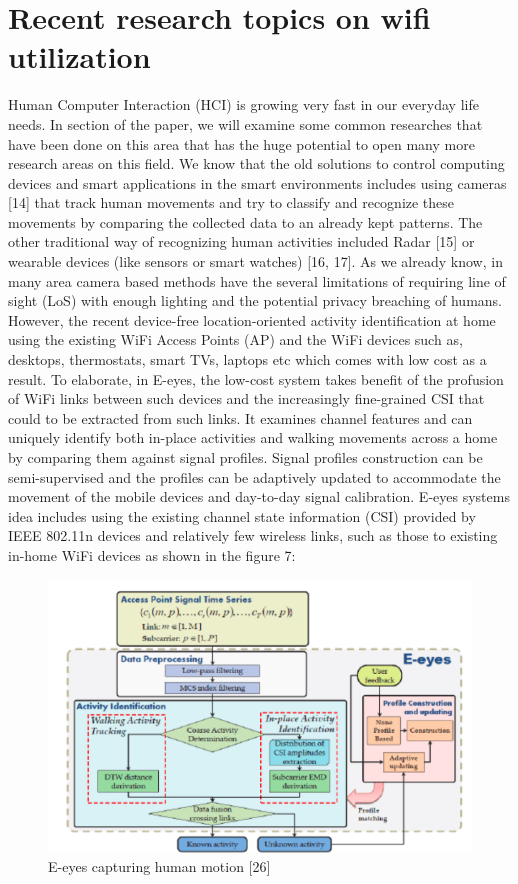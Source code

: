 \documentclass[conference]{IEEEtran}
\begin{document}
\section{Recent research topics on wifi utilization}
Human Computer Interaction (HCI) is growing very fast in our everyday life needs. In section of the paper, we will examine some common researches that have been done on this area that has the huge potential to open many more research areas on this field. We know that  the old solutions to control computing devices and smart applications in the smart environments includes using cameras [14] that track human 
movements and try to classify and recognize these movements by comparing the collected data to an already kept patterns. The other traditional way of recognizing human activities included Radar [15] or wearable devices (like sensors or smart watches) [16, 17]. As we already know, in many area camera based methods have the several limitations of requiring line of sight (LoS) with enough lighting and the potential privacy breaching of humans. 
\newline 
However, the recent device-free location-oriented activity identification at home using the existing WiFi Access Points (AP) and the WiFi devices such as, desktops, thermostats, smart TVs, laptops etc which comes with low cost as a result. To elaborate, in E-eyes, the low-cost system takes benefit of the profusion of WiFi links between such devices and the increasingly fine-grained CSI that could to be extracted from such links. It examines channel features and can uniquely identify both in-place activities and walking movements across a home by comparing 
them against signal profiles. Signal profiles construction can be semi-supervised and the 
profiles can be adaptively updated to accommodate the movement of the mobile devices and day-to-day signal calibration. E-eyes systems idea includes using the existing 
channel state information (CSI) provided by IEEE 802.11n devices and relatively few 
wireless links, such as those to existing in-home WiFi devices as shown in the figure 7:

\begin{figure}[h!]
    \includegraphics[scale=0.30]{fig2.png}
    \caption{E-eyes capturing human motion [26]}
    \label{fig:me}
\end{figure}
\end{document}
